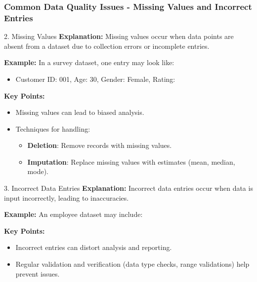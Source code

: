 \documentclass[aspectratio=169]{beamer}
\begin{document}
\begin{frame}[fragile]
    \frametitle{Common Data Quality Issues - Missing Values and Incorrect Entries}
    \begin{block}{2. Missing Values}
        \textbf{Explanation:} 
        Missing values occur when data points are absent from a dataset due to collection errors or incomplete entries.
        
        \textbf{Example:} 
        In a survey dataset, one entry may look like:
        \begin{itemize}
            \item Customer ID: 001, Age: 30, Gender: Female, Rating: 
        \end{itemize}

        \textbf{Key Points:}
        \begin{itemize}
            \item Missing values can lead to biased analysis.
            \item Techniques for handling:
            \begin{itemize}
                \item \textbf{Deletion}: Remove records with missing values.
                \item \textbf{Imputation}: Replace missing values with estimates (mean, median, mode).
            \end{itemize}
        \end{itemize}
    \end{block}
    
    \begin{block}{3. Incorrect Data Entries}
        \textbf{Explanation:} 
        Incorrect data entries occur when data is input incorrectly, leading to inaccuracies.
        
        \textbf{Example:} 
        An employee dataset may include:

        \textbf{Key Points:}
        \begin{itemize}
            \item Incorrect entries can distort analysis and reporting.
            \item Regular validation and verification (data type checks, range validations) help prevent issues.
        \end{itemize}
    \end{block}
\end{frame}
\end{document}
